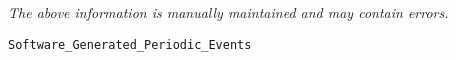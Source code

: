 \label{pkg:software\_generated\_periodic\_events}

{\tiny \it The above information is manually maintained and may contain errors.}
\begin{verbatim}
Software_Generated_Periodic_Events
\end{verbatim}
